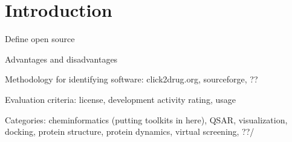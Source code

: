 \section*{Introduction}

Define open source

Advantages and disadvantages

Methodology for identifying software: click2drug.org, sourceforge, ??

Evaluation criteria: license, development activity rating, usage

Categories:
 cheminformatics (putting toolkits in here), QSAR, visualization, docking, protein structure, protein dynamics, virtual screening, ??/